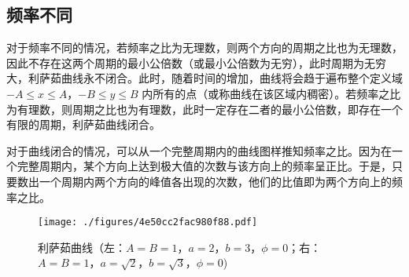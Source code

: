 \subsection{频率不同}
对于频率不同的情况，若频率之比为无理数，则两个方向的周期之比也为无理数，因此不存在这两个周期的最小公倍数（或最小公倍数为无穷），此时周期为无穷大，利萨茹曲线永不闭合。此时，随着时间的增加，曲线将会趋于遍布整个定义域 $-A\leqslant x \leqslant A$，$-B \leqslant y \leqslant B$ 内所有的点（或称曲线在该区域内稠密）。若频率之比为有理数，则周期之比也为有理数，此时一定存在二者的最小公倍数，即存在一个有限的周期，利萨茹曲线闭合。

对于曲线闭合的情况，可以从一个完整周期内的曲线图样推知频率之比。因为在一个完整周期内，某个方向上达到极大值的次数与该方向上的频率呈正比。于是，只要数出一个周期内两个方向的峰值各出现的次数，他们的比值即为两个方向上的频率之比。
\begin{figure}[ht]
\centering
\texttt{[image: ./figures/4e50cc2fac980f88.pdf]}
\caption{利萨茹曲线（左：$A=B=1$，$a=2$，$b=3$，$\phi=0$；右：$A=B=1$，$a=\sqrt 2$，$b=\sqrt 3$，$\phi=0$)} \label{fig_Lissaj_2}
\end{figure}
